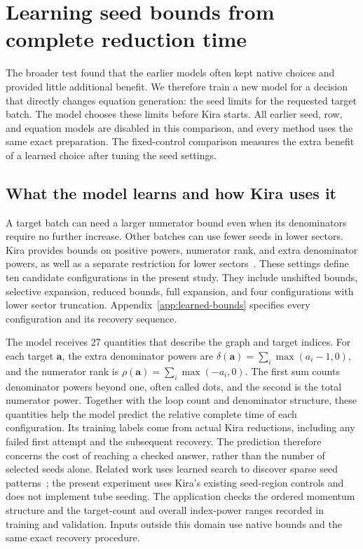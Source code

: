 \section{Learning seed bounds from complete reduction time}
\label{sec:learned-bounds}
The broader test found that the earlier models often kept native choices and provided little additional benefit. We therefore train a new model for a decision that directly changes equation generation: the seed limits for the requested target batch. The model chooses these limits before Kira starts. All earlier seed, row, and equation models are disabled in this comparison, and every method uses the same exact preparation. The fixed-control comparison measures the extra benefit of a learned choice after tuning the seed settings.

\subsection{What the model learns and how Kira uses it}
A target batch can need a larger numerator bound even when its denominators require no further increase. Other batches can use fewer seeds in lower sectors. Kira provides bounds on positive powers, numerator rank, and extra denominator powers, as well as a separate restriction for lower sectors~\cite{Kira3}. These settings define ten candidate configurations in the present study. They include unshifted bounds, selective expansion, reduced bounds, full expansion, and four configurations with lower sector truncation. Appendix~\ref{app:learned-bounds} specifies every configuration and its recovery sequence.

The model receives 27 quantities that describe the graph and target indices. For each target $\boldsymbol a$, the extra denominator powers are $\delta(\boldsymbol a)=\sum_i\max(a_i-1,0)$, and the numerator rank is $\rho(\boldsymbol a)=\sum_i\max(-a_i,0)$. The first sum counts denominator powers beyond one, often called dots, and the second is the total numerator power. Together with the loop count and denominator structure, these quantities help the model predict the relative complete time of each configuration. Its training labels come from actual Kira reductions, including any failed first attempt and the subsequent recovery. The prediction therefore concerns the cost of reaching a checked answer, rather than the number of selected seeds alone. Related work uses learned search to discover sparse seed patterns~\cite{Song2025,TubeSeeding2026}; the present experiment uses Kira's existing seed-region controls and does not implement tube seeding. The application checks the ordered momentum structure and the target-count and overall index-power ranges recorded in training and validation. Inputs outside this domain use native bounds and the same exact recovery procedure.

